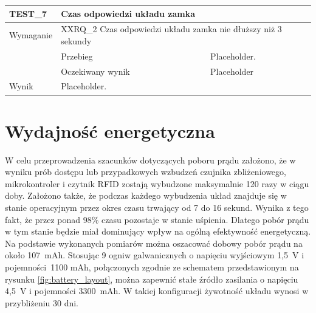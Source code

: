 \begin{table}[h!]
\begin{subtable}[c]{\textwidth}
                \centering
                    \begin{tabular}{|p{2cm}|p{}|p{}|}
                    \hline
                    TEST\_7               & \multicolumn{2}{l|}{\textbf{Czas odpowiedzi układu zamka}}                                                            \\ \hline
                    \cellcolor[gray]{0.8} Wymaganie             & \multicolumn{2}{p{12cm}|}{XXRQ\_2 Czas odpowiedzi układu zamka nie dłuższy niż 3 sekundy }                                                                                    \\ \hline
                    \cellcolor[gray]{0.8} \multirow{2}{*}{Opis} & Przebieg           & Placeholder.  \\ \cline{2-3} 
                    \cellcolor[gray]{0.8}                      & Oczekiwany wynik   & Placeholder                                                 \\ \hline
                    \cellcolor[gray]{0.8} Wynik                 & \multicolumn{2}{p{12cm}|}{Placeholder.}                                                                                  \\ \hline
                    \end{tabular}%
                \label{tbl:test6}
                \vspace{10mm}           
            \end{subtable}
            \label{tbl:tests}
        \end{table}

    \newpage

    \section{Wydajność energetyczna}

        W celu przeprowadzenia szacunków dotyczących poboru prądu założono, że w wyniku prób dostępu lub przypadkowych wzbudzeń czujnika zbliżeniowego, mikrokontroler i czytnik RFID zostają wybudzone maksymalnie 120 razy w ciągu doby. Założono także, że podczas każdego wybudzenia układ znajduje się w stanie operacyjnym przez okres czasu trwający od 7 do 16 sekund. Wynika z tego fakt, że przez ponad 98\% czasu pozostaje w stanie uśpienia. Dlatego pobór prądu w tym stanie będzie miał dominujący wpływ na ogólną efektywność energetyczną. Na podstawie wykonanych pomiarów można oszacować dobowy pobór prądu na około 107~mAh. Stosując 9 ogniw galwanicznych o napięciu wyjściowym 1,5~V i pojemności~1100 mAh, połączonych zgodnie ze schematem przedstawionym na rysunku \ref{fig:battery_layout}, można zapewnić stałe źródło zasilania o napięciu 4,5~V i pojemności 3300~mAh. W takiej konfiguracji żywotność układu wynosi w przybliżeniu 30 dni.

